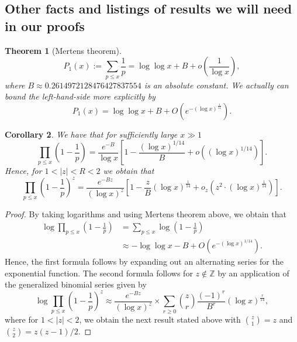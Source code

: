 \documentclass[11pt,reqno,a4letter]{article}
\numberwithin{figure}{section}
\numberwithin{table}{section}
\theoremstyle{plain}
\newtheorem{theorem}{Theorem}
\newtheorem{cor}[theorem]{Corollary}
\numberwithin{theorem}{section}
\theoremstyle{definition}
\begin{document}
\subsection{Other facts and listings of results we will need in our proofs} 
\label{subSection_OtherFactsAndResults} 

\begin{theorem}[Mertens theorem]
\label{theorem_Mertens_theorem}  
\[
P_1(x) := \sum_{p \leq x} \frac{1}{p} = \log\log x + B + o\left(\frac{1}{\log x}\right), 
\]
where $B \approx 0.2614972128476427837554$ is an absolute constant. We actually can bound the 
left-hand-side more explicitly by 
\[
P_1(x) = \log\log x + B + O\left(e^{-(\log x)^{\frac{1}{14}}}\right). 
\]
\end{theorem} 

\begin{cor}
\label{lemma_Gz_productTermV2} 
We have that for sufficiently large $x \gg 1$ 
\[
\prod_{p \leq x} \left(1 - \frac{1}{p}\right) = \frac{e^{-B}}{\log x}\left[ 
     1 - \frac{(\log x)^{1/14}}{B} + o\left((\log x)^{1/14}\right)\right]. 
\]
Hence, for $1 < |z| < R < 2$ we obtain that 
\[
\prod_{p \leq x} \left(1 - \frac{1}{p}\right)^{z} = \frac{e^{-Bz}}{(\log x)^{z}} \left[ 
     1 - \frac{z}{B} (\log x)^{\frac{1}{14}} + o_z\left(z^2 \cdot (\log x)^{\frac{1}{14}}\right)\right]. 
\]
\end{cor} 
\begin{proof} 
By taking logarithms and using Mertens theorem above, we obtain that 
\begin{align*} 
\log \prod_{p \leq x} \left(1-\frac{1}{p}\right) & = \sum_{p \leq x} \log\left(1-\frac{1}{p}\right) \\ 
     & \approx -\log\log x - B +O\left(e^{-(\log x)^{1/14}}\right). 
\end{align*} 
Hence, the first formula follows by expanding out an alternating series for the exponential 
function. The second formula follows for $z \notin \mathbb{Z}$ by an application of the 
generalized binomial series given by 
\[
\log \prod_{p \leq x} \left(1-\frac{1}{p}\right)^{z} \approx \frac{e^{-Bz}}{(\log x)^{z}} \times 
     \sum_{r \geq 0} \binom{z}{r} \frac{(-1)^r}{B^r} (\log x)^{\frac{r}{14}}, 
\]
where for $1 < |z| < 2$, we obtain the next result stated above with 
$\binom{z}{1} = z$ and $\binom{z}{2} = z(z-1) / 2$. 
\end{proof} 
\end{document}
